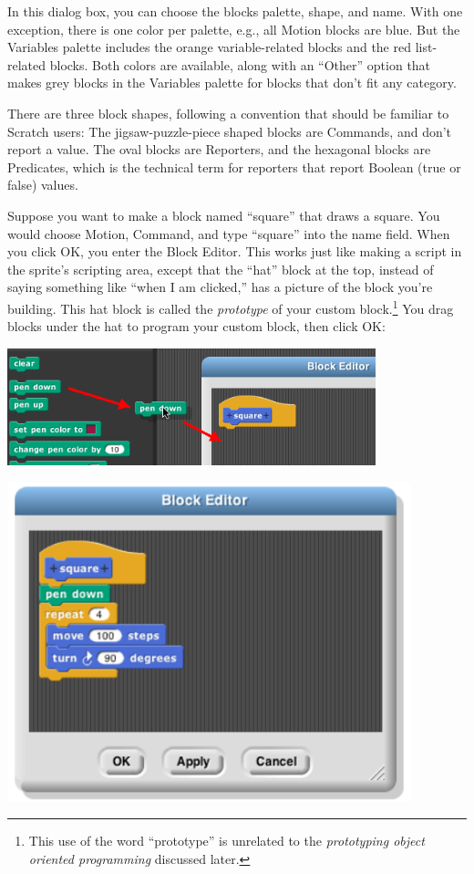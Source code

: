 In this dialog box, you can choose the block\textquotesingle s palette,
shape, and name. With one exception, there is one color per palette,
e.g., all Motion blocks are blue. But the Variables palette includes the
orange variable-related blocks and the red list-related blocks. Both
colors are available, along with an ``Other'' option that makes grey
blocks in the Variables palette for blocks that don't fit any category.

There are three block shapes, following a convention that should be
familiar to Scratch users: The jigsaw-puzzle-piece shaped blocks are
Commands, and don't report a value. The oval blocks are Reporters, and
the hexagonal blocks are Predicates, which is the technical term for
reporters that report Boolean (true or false) values.

Suppose you want to make a block named ``square'' that draws a square.
You would choose Motion, Command, and type ``square'' into the name
field. When you click OK, you enter the Block Editor. This works just
like making a script in the sprite's scripting area, except that the
``hat'' block at the top, instead of saying something like ``when I am
clicked,'' has a picture of the block you're building. This hat block is
called the \emph{prototype} of your custom block.\footnote{This use of
  the word ``prototype'' is unrelated to the \emph{prototyping object
  oriented programming} discussed later.} You drag blocks under the hat
to program your custom block, then click OK:

\includegraphics[width=4.21094in,height=1.3364in]{media/image502.png}

\includegraphics[width=4.61556in,height=3.64778in]{media/image503.png}

